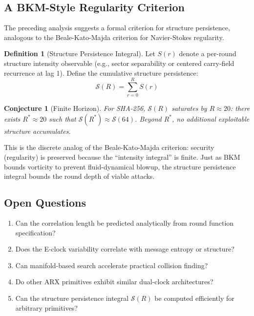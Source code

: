 \documentclass[11pt,a4paper]{article}
\theoremstyle{plain}
\newtheorem{conjecture}[theorem]{Conjecture}
\theoremstyle{definition}
\newtheorem{definition}[theorem]{Definition}
\theoremstyle{remark}
\begin{document}
\subsection{A BKM-Style Regularity Criterion}

The preceding analysis suggests a formal criterion for structure persistence, analogous to the Beale-Kato-Majda criterion for Navier-Stokes regularity.

\begin{definition}[Structure Persistence Integral]
Let $S(r)$ denote a per-round structure intensity observable (e.g., sector separability or centered carry-field recurrence at lag 1). Define the cumulative structure persistence:
\begin{equation}
    \mathcal{S}(R) = \sum_{r=0}^{R} S(r)
\end{equation}
\end{definition}

\begin{conjecture}[Finite Horizon]
For SHA-256, $\mathcal{S}(R)$ saturates by $R \approx 20$: there exists $R^* \approx 20$ such that $\mathcal{S}(R^*) \approx \mathcal{S}(64)$. Beyond $R^*$, no additional exploitable structure accumulates.
\end{conjecture}

This is the discrete analog of the Beale-Kato-Majda criterion: security (regularity) is preserved because the ``intensity integral'' is finite. Just as BKM bounds vorticity to prevent fluid-dynamical blowup, the structure persistence integral bounds the round depth of viable attacks.

\subsection{Open Questions}

\begin{enumerate}
    \item Can the correlation length be predicted analytically from round function specification?
    \item Does the E-clock variability correlate with message entropy or structure?
    \item Can manifold-based search accelerate practical collision finding?
    \item Do other ARX primitives exhibit similar dual-clock architectures?
    \item Can the structure persistence integral $\mathcal{S}(R)$ be computed efficiently for arbitrary primitives?
\end{enumerate}
\end{document}
